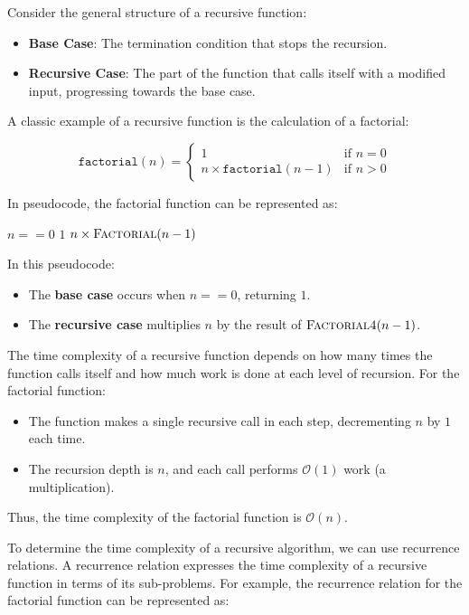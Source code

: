 Consider the general structure of a recursive function:

\begin{itemize}
    \item \textbf{Base Case}: The termination condition that stops the recursion.
    \item \textbf{Recursive Case}: The part of the function that calls itself with a modified input, progressing towards the base case.
\end{itemize}

A classic example of a recursive function is the calculation of a factorial:

\[
\texttt{factorial}(n) = 
\begin{cases}
1 & \text{if } n = 0 \\
n \times \texttt{factorial}(n-1) & \text{if } n > 0
\end{cases}
\]

In pseudocode, the factorial function can be represented as:

\begin{codebox}
    \li \If $n == 0$ \Then
    \li     \Return $1$
        \End
    \li \Return $n \times \proc{Factorial}(n-1)$
\end{codebox}

In this pseudocode:
\begin{itemize}
    \item The \textbf{base case} occurs when $n == 0$, returning $1$.
    \item The \textbf{recursive case} multiplies $n$ by the result of $\proc{Factorial4}(n-1)$.
\end{itemize}

The time complexity of a recursive function depends on how many times the function calls itself and how much work is done at each level of recursion. For the factorial function:

\begin{itemize}
    \item The function makes a single recursive call in each step, decrementing $n$ by $1$ each time.
    \item The recursion depth is $n$, and each call performs $\mathcal{O}(1)$ work (a multiplication).
\end{itemize}

Thus, the time complexity of the factorial function is $\mathcal{O}(n)$.

To determine the time complexity of a recursive algorithm, we can use recurrence relations. A recurrence relation expresses the time complexity of a recursive function in terms of its sub-problems. For example, the recurrence relation for the factorial function can be represented as:

